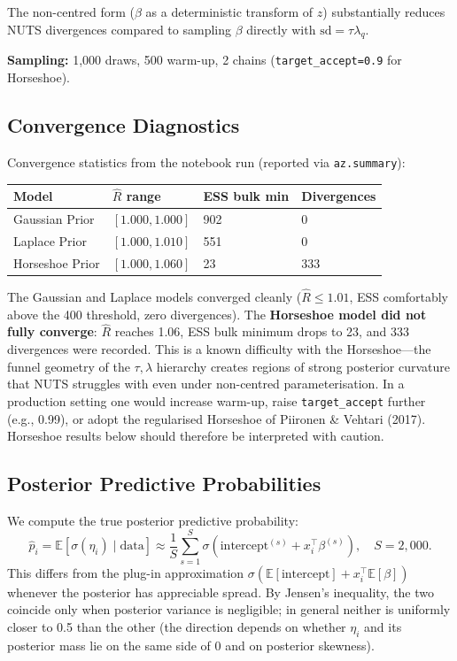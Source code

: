 \documentclass[10pt, letterpaper]{article}
\begin{document}
The non-centred form ($\beta$ as a deterministic transform of $z$) substantially reduces NUTS divergences compared to sampling $\beta$ directly with $\text{sd} = \tau \lambda_q$.

\textbf{Sampling:} 1{,}000 draws, 500 warm-up, 2 chains (\texttt{target\_accept=0.9} for Horseshoe).

\subsection{Convergence Diagnostics}
Convergence statistics from the notebook run (reported via \texttt{az.summary}):

\begin{center}\small
\renewcommand{\arraystretch}{1.2}
\begin{tabular}{@{}llll@{}}
\toprule
Model & $\hat{R}$ range & ESS bulk min & Divergences \\
\midrule
Gaussian Prior  & $[1.000, 1.000]$ & 902 & 0 \\
Laplace Prior   & $[1.000, 1.010]$ & 551 & 0 \\
Horseshoe Prior & $[1.000, 1.060]$ & 23  & 333 \\
\bottomrule
\end{tabular}
\end{center}

The Gaussian and Laplace models converged cleanly ($\hat{R} \leq 1.01$, ESS comfortably above the 400 threshold, zero divergences). The \textbf{Horseshoe model did not fully converge}: $\hat{R}$ reaches 1.06, ESS bulk minimum drops to 23, and 333 divergences were recorded. This is a known difficulty with the Horseshoe---the funnel geometry of the $\tau, \lambda$ hierarchy creates regions of strong posterior curvature that NUTS struggles with even under non-centred parameterisation. In a production setting one would increase warm-up, raise \texttt{target\_accept} further (e.g., 0.99), or adopt the regularised Horseshoe of Piironen \& Vehtari (2017). Horseshoe results below should therefore be interpreted with caution.

\subsection{Posterior Predictive Probabilities}
We compute the true posterior predictive probability:
\[
\hat{p}_i = \mathbb{E}\left[ \sigma(\eta_i) \mid \text{data} \right] \approx \frac{1}{S} \sum_{s=1}^{S} \sigma\left( \text{intercept}^{(s)} + x_i^\top \beta^{(s)} \right), \quad S = 2{,}000.
\]
This differs from the plug-in approximation $\sigma\left( \mathbb{E}[\text{intercept}] + x_i^\top \mathbb{E}[\beta] \right)$ whenever the posterior has appreciable spread. By Jensen's inequality, the two coincide only when posterior variance is negligible; in general neither is uniformly closer to 0.5 than the other (the direction depends on whether $\eta_i$ and its posterior mass lie on the same side of 0 and on posterior skewness).
\end{document}

